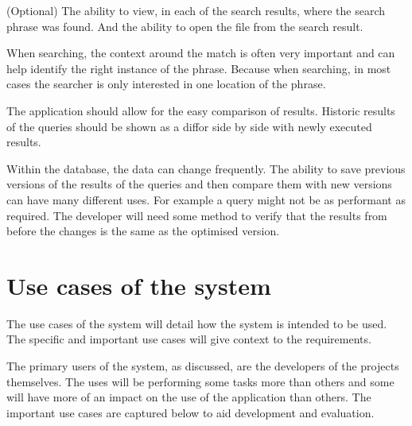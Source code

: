\begin{requirement}{(Optional)}
The ability to view, in each of the search results, where the search phrase was
found. And the ability to open the file from the search result.

When searching, the context around the match is often very important and can
help identify the right instance of the phrase. Because when searching, in most
cases the searcher is only interested in one location of the phrase.
\end{requirement}

\begin{requirement}
The application should allow for the easy comparison of results. Historic results
of the queries should be shown as a diff\footnotemark or side by side with newly executed
results.


Within the database, the data can change frequently. The ability to save
previous versions of the results of the queries and then compare them with new
versions can have many different uses. For example a query might not be as
performant as required. The developer will need some method to verify that the
results from before the changes is the same as the optimised version.
\end{requirement}

\section{Use cases of the system}\label{use-cases-of-the-system}

The use cases of the system will detail how the system is intended to be used.
The specific and important use cases will give context to the requirements.

The primary users of the system, as discussed, are the developers of the projects
themselves. The uses will be performing some tasks more than others and some
will have more of an impact on the use of the application than others. The
important use cases are captured below to aid development and evaluation.

